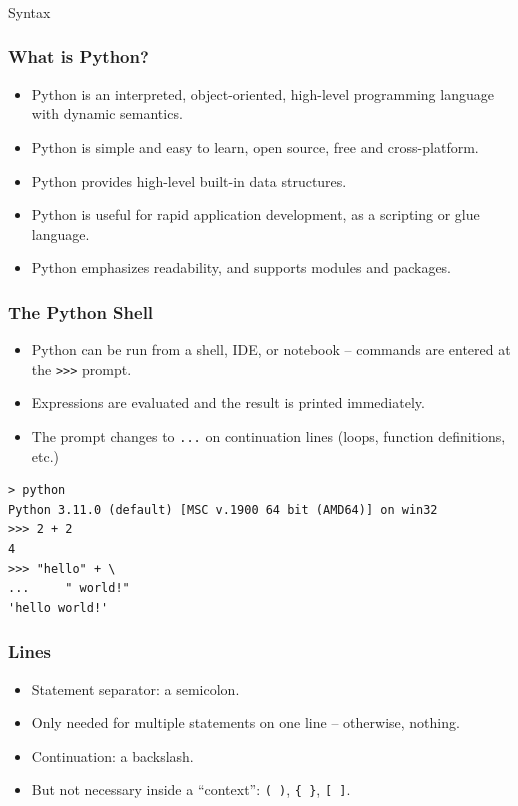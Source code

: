\begin{frame}[fragile]\frametitle{}
\begin{center}
{\Large Syntax}
\end{center}
\end{frame}

\begin{frame}[fragile]  \frametitle{What is Python?}
\begin{itemize}
\item Python is an interpreted, object-oriented, high-level programming language with dynamic semantics.
\item Python is simple and easy to learn, open source, free and cross-platform.
\item Python provides high-level built-in data structures.
\item Python is useful for rapid application development, as a scripting or glue language.
\item Python emphasizes readability, and supports modules and packages.
\end{itemize}
\end{frame}

\begin{frame}[fragile]  \frametitle{The Python Shell}
	\begin{itemize}
	\item Python can be run from a shell, IDE, or notebook -- commands are entered at the \texttt{>>>} prompt.
	\item Expressions are evaluated and the result is printed immediately.
	\item The prompt changes to \texttt{...} on continuation lines (loops, function definitions, etc.)
	\end{itemize}
\begin{lstlisting}
> python
Python 3.11.0 (default) [MSC v.1900 64 bit (AMD64)] on win32
>>> 2 + 2
4
>>> "hello" + \
...     " world!"
'hello world!'
\end{lstlisting}
\end{frame}

\begin{frame}[fragile] \frametitle{Lines}
\begin{itemize}
\item Statement separator: a semicolon.
\item Only needed for multiple statements on one line -- otherwise, nothing.
\item Continuation: a backslash.
\item But not necessary inside a ``context'': \texttt{( )}, \texttt{\{ \}}, \texttt{[ ]}.
\end{itemize}
\end{frame}

